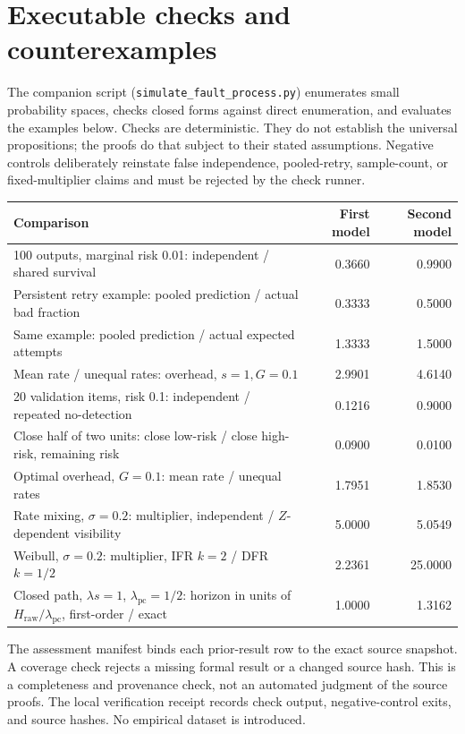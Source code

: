 \documentclass[11pt]{article}
\theoremstyle{definition}
\theoremstyle{remark}
\begin{document}
\section{Executable checks and counterexamples}\label{sec:checks}
The companion script (\texttt{simulate\_fault\_process.py}) enumerates small probability spaces, checks closed forms against direct
enumeration, and evaluates the examples below. Checks are deterministic. They do not establish
the universal propositions; the proofs do that subject to their stated assumptions.
Negative controls deliberately reinstate false independence, pooled-retry, sample-count, or
fixed-multiplier claims and must be rejected by the check runner.

\begin{center}\small
\begin{tabular}{p{}rr}
\toprule Comparison & First model & Second model\\\midrule
100 outputs, marginal risk 0.01: independent / shared survival & 0.3660 & 0.9900\\
Persistent retry example: pooled prediction / actual bad fraction & 0.3333 & 0.5000\\
Same example: pooled prediction / actual expected attempts & 1.3333 & 1.5000\\
Mean rate / unequal rates: overhead, $s=1,G=0.1$ & 2.9901 & 4.6140\\
20 validation items, risk 0.1: independent / repeated no-detection & 0.1216 & 0.9000\\
Close half of two units: close low-risk / close high-risk, remaining risk & 0.0900 & 0.0100\\
Optimal overhead, $G=0.1$: mean rate / unequal rates & 1.7951 & 1.8530\\
Rate mixing, $\sigma=0.2$: multiplier, independent / $Z$-dependent visibility & 5.0000 & 5.0549\\
Weibull, $\sigma=0.2$: multiplier, IFR $k=2$ / DFR $k=1/2$ & 2.2361 & 25.0000\\
Closed path, $\lambda s=1$, $\lambda_{\mathrm{pc}}=1/2$: horizon in units of $H_{\mathrm{raw}}/\lambda_{\mathrm{pc}}$, first-order / exact & 1.0000 & 1.3162\\
\bottomrule
\end{tabular}
\end{center}

The assessment manifest binds each prior-result row to the exact source snapshot. A coverage
check rejects a missing formal result or a changed source hash. This is a completeness and
provenance check, not an automated judgment of the source proofs. The local verification
receipt records check output, negative-control exits, and source hashes. No empirical dataset
is introduced.
\end{document}
